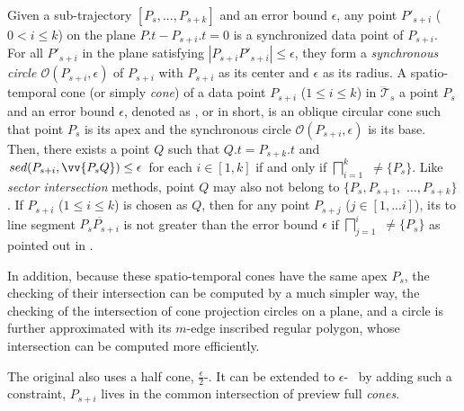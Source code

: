 Given a sub-trajectory $[P_s,...,P_{s+k}]$ and an error bound $\epsilon$, any point $P'_{s+i}$ ($0< i \le k$) on the plane $P.t-P_{s+i}.t = 0$ is a synchronized data point of $P_{s+i}$. For all $P'_{s+i}$ in the plane satisfying $|P_{s+i}P'_{s+i}| \le \epsilon$, they form a \textit{synchronous circle $\mathcal{O}(P_{s+i}, \epsilon)$} of $P_{s+i}$ with $P_{s+i}$ as its center and $\epsilon$ as its radius.
%
A spatio-temporal cone (or simply \textit{cone}) of a data point $P_{s+i}$ ($1\le i\le k$) in $\dddot{\mathcal{T}}_s$ \wrt a point $P_s$ and an error bound $\epsilon$, denoted as , or  in short, is an oblique circular cone such that point $P_s$ is its apex and the synchronous circle $\mathcal{O}(P_{s+i}, \epsilon)$ is its base.
%
Then, there exists a point $Q$ such that $Q.t = P_{s+k}.t$ and $sed(P_{s+i}, \vv{P_sQ})\le \epsilon$ for each $i \in [1,k]$ if and only if $\bigsqcap_{i=1}^{k}$ $\ne \{P_s\}$.
%
Like \textit{sector intersection} methods, point $Q$ may also not belong to $\{P_{s}, P_{s+1},$ $\ldots, P_{s+k}\}$. If $P_{s+i}$ ($1\le i\le k$) is chosen as $Q$, then for any point $P_{s+j}$ ($j \in [1, ... i]$), its \sed to
line segment $\overline{P_sP_{s+i}}$ is not greater than the error bound $\epsilon$ if
$\bigsqcap_{j=1}^{i}$ $\ne \{P_s\}$ as pointed out in \cite{Lin:Cised}.

In addition, because these spatio-temporal cones have the same apex $P_s$, the checking of their intersection can be computed by a much simpler way, \ie the checking of the intersection of cone projection circles on a plane, and a circle is further approximated with its $m$-edge inscribed regular polygon, whose intersection can be computed more efficiently. %

The original \cised also uses a half cone, $\frac{\epsilon}{2}$-\cone. It can be extended to ${\epsilon}$-\cone ~ by adding such a constraint, \ie $P_{s+i}$ lives in the common intersection of preview full \emph{cones}.





